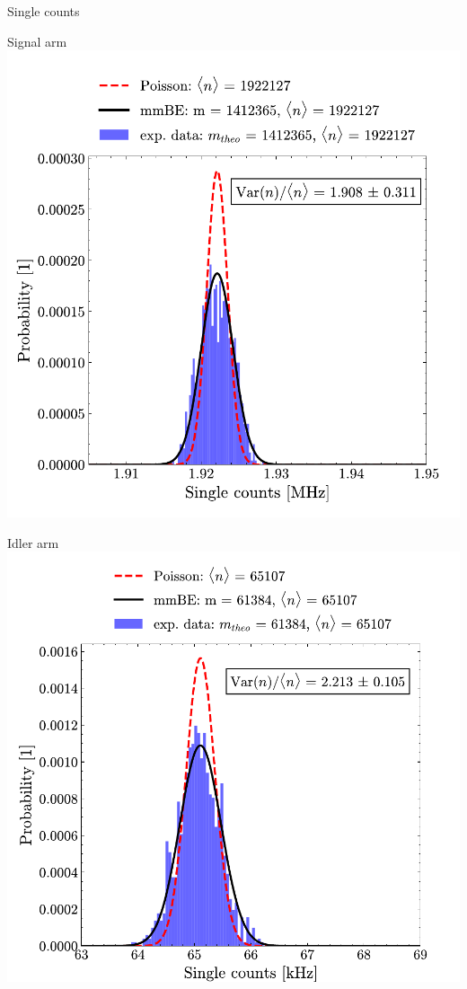 \documentclass[10pt,aspectratio=43]{beamer}
\begin{document}
	\begin{frame}{Single counts}
		\begin{minipage}{.45\textwidth}
			\centering
			Signal arm
			\vspace{2em}
			\includegraphics[width=\textwidth]{Images/SingleStatisticsSignal_4.pdf}
		\end{minipage}
		\hfill
		\begin{minipage}{.45\textwidth}
			\centering
			Idler arm
			\vspace{2em}
			\includegraphics[width=\textwidth]{Images/SingleStatisticsIdler_4.pdf}

\end{minipage}
\end{frame}
\end{document}
